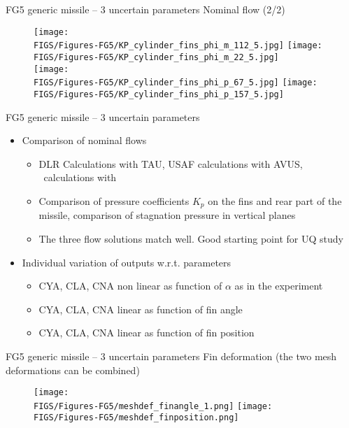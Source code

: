 \documentclass[10pt]{beamer}
\def\vs{\vspace{7mm}}
\def\begit{\begin{itemize}}
\def\endit{\end{itemize}}
\begin{document}
%
%
\begin{frame}{FG5 generic missile -- 3 uncertain parameters} {Nominal flow (2/2)}
% 
\begin{figure}[!h]
\begin{center}
\texttt{[image: \\FIGS/Figures-FG5/KP\_cylinder\_fins\_phi\_m\_112\_5.jpg]}
\texttt{[image: \\FIGS/Figures-FG5/KP\_cylinder\_fins\_phi\_m\_22\_5.jpg]}
\\
\texttt{[image: \\FIGS/Figures-FG5/KP\_cylinder\_fins\_phi\_p\_67\_5.jpg]}
\texttt{[image: \\FIGS/Figures-FG5/KP\_cylinder\_fins\_phi\_p\_157\_5.jpg]}
\end{center}
\end{figure}
%
\end{frame} 
%

\begin{frame}{FG5 generic missile -- 3 uncertain parameters}  

\begit
\item Comparison of nominal flows
    \begit
    \item DLR Calculations with TAU, USAF calculations with AVUS, \Onera\ calculations with \elsA\
    \item Comparison of pressure coefficients $K_p$ on the fins and rear part of the missile, comparison of stagnation pressure in vertical planes
    \item The three flow solutions match well. Good starting point for UQ study
    \endit
\vs  
\item Individual variation of outputs w.r.t. parameters
   \begit
   \item CYA, CLA, CNA non linear as function of $\alpha$ as in the experiment 
   \item CYA, CLA, CNA linear as function of fin angle
   \item CYA, CLA, CNA linear as function of fin position
   \endit
\endit
%
\end{frame} 
%

%
\begin{frame}{FG5 generic missile -- 3 uncertain parameters} {Fin deformation}
%
 (the two mesh deformations can be combined)
%
\begin{figure}[!h]
\begin{center}
\texttt{[image: \\FIGS/Figures-FG5/meshdef\_finangle\_1.png]}
\hspace{3mm}
\texttt{[image: \\FIGS/Figures-FG5/meshdef\_finposition.png]}
\end{center}
\end{figure}
%
\end{frame}
%
\end{document}
